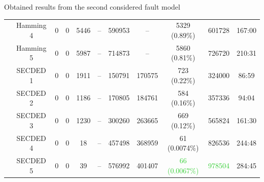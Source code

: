 \begin{frame}{Obtained results from the second considered fault model}
\begin{table}[H]
\begin{tabular}{@{}ccccccccccc@{}}
                                                               & Hamming 4     & 0     & 0            & 5446  & --          & \num{590953}                             & --                                      & 5329 {\tiny (0.89\%)}                        & \num{601728} & 167:00                                  \\
                                                               & Hamming 5     & 0     & 0            & 5987  & --          & \num{714873}                             & --                                      & 5860 {\tiny (0.81\%)}                        & \num{726720} & 210:31                                  \\
                                                               & SECDED 1      & 0     & 0            & 1911  & --          & \num{150791}                             & \num{170575}                            & 723 {\tiny (0.22\%)}                         & \num{324000} & 86:59                                   \\
                                                               & SECDED 2      & 0     & 0            & 1186  & --          & \num{170805}                             & \num{184761}                            & 584 {\tiny (0.16\%)}                         & \num{357336} & 94:04                                   \\
                                                               & SECDED 3      & 0     & 0            & 1230  & --          & \num{300260}                             & \num{263665}                            & 669 {\tiny (0.12\%)}                         & \num{565824} & 161:30                                  \\
                                                               & SECDED 4      & 0     & 0            & 18    & --          & \num{457498}                             & \num{368959}                            & 61 {\tiny (0.0074\%)}                          & \num{826536} & 244:48                                  \\
                                                               & SECDED 5      & 0     & 0            & 39    & --          & \num{576992}                             & \num{401407}                            & \textcolor{LimeGreen}{66 {\tiny (0.0067\%)}}   & \textcolor{LimeGreen}{\num{978504}} & 284:45                                  \\
            \bottomrule
        \end{tabular}
    \end{table}
\end{frame}
